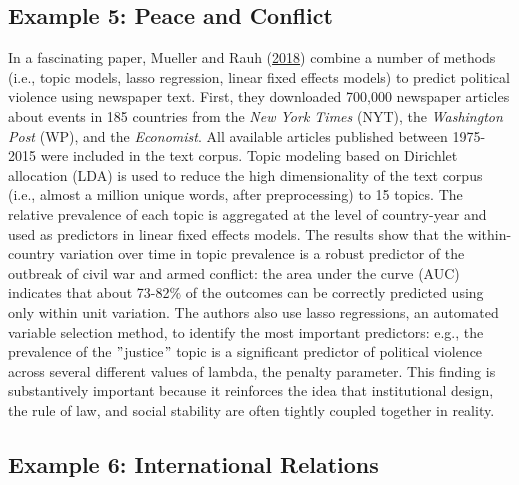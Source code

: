 \documentclass{book}
\begin{document}
\hypertarget{example-5-peace-and-conflict}{%
\subsection{Example 5: Peace and
Conflict}\label{example-5-peace-and-conflict}}

In a fascinating paper, Mueller and Rauh
(\protect\hyperlink{ref-mueller2018a}{2018}) combine a number of methods
(i.e., topic models, lasso regression, linear fixed effects models) to predict
political violence using newspaper text. First, they downloaded 700,000
newspaper articles about events in 185 countries from the \emph{New York
Times} (NYT), the \emph{Washington Post} (WP), and the \emph{Economist}. All
available articles published between 1975-2015 were included in the text
corpus. Topic modeling based on Dirichlet allocation (LDA) is used to reduce
the high dimensionality of the text corpus (i.e., almost a million unique
words, after preprocessing) to 15 topics. The relative prevalence of each
topic is aggregated at the level of country-year and used as predictors in
linear fixed effects models. The results show that the within-country
variation over time in topic prevalence is a robust predictor of the outbreak
of civil war and armed conflict: the area under the curve (AUC) indicates that
about 73-82\(\%\) of the outcomes can be correctly predicted using only within
unit variation. The authors also use lasso regressions, an automated variable
selection method, to identify the most important predictors: e.g., the
prevalence of the \("\)justice\("\) topic is a significant predictor of
political violence across several different values of lambda, the penalty
parameter. This finding is substantively important because it reinforces the
idea that institutional design, the rule of law, and social stability are
often tightly coupled together in reality.

\hypertarget{example-6-international-relations}{%
\subsection{Example 6: International
Relations}\label{example-6-international-relations}}
\end{document}
